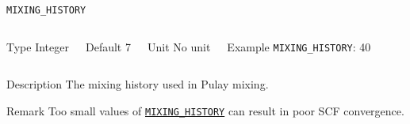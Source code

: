 \documentclass[xcolor=dvipsnames,t]{beamer}
\begin{document}
\begin{frame}[allowframebreaks]{\texttt{MIXING\_HISTORY}} \label{MIXING_HISTORY}
\vspace*{-12pt}
\begin{columns}
\begin{block}{Type}
Integer
\end{block}

\begin{block}{Default}
7
\end{block}

\begin{block}{Unit}
No unit
\end{block}

\begin{block}{Example}
\texttt{MIXING\_HISTORY}: 40
\end{block}
\end{columns}

\begin{block}{Description}
The mixing history used in Pulay mixing.
\end{block}

\begin{block}{Remark}
Too small values of \hyperlink{MIXING_HISTORY}{\texttt{MIXING\_HISTORY}} can result in poor SCF convergence.
\end{block}

\end{frame}
\end{document}
